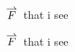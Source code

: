 \documentclass{minimal}
\newcommand{\tikzoverset}[2]{%
  \tikz[baseline=(X.base),inner sep=0pt,outer sep=0pt]{%
    \node[inner sep=0pt,outer sep=0pt] (X) {$#2$}; 
    \node[yshift=1pt] at (X.north) {$\, #1\,$};
}}
\begin{document}
$\tikzoverset{\rightharpoonup}{F}$ that i see

$\tikzoverset{\rightharpoonup}{F}$ that i see
\end{document}
